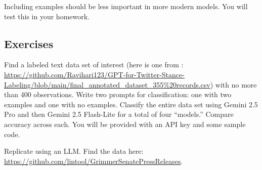 Including examples should be less important in more modern models. You will test this in your homework.

\subsection{Exercises}

\begin{tcolorbox}[breakable, size=fbox, boxrule=1pt, pad at break*=1mm,colback=cellbackground, colframe=cellborder, title=Exercise: LLM Classification Comparison]
Find a labeled text data set of interest (here is one from \cite{liyanage2024gpt}: \url{https://github.com/Ravihari123/GPT-for-Twitter-Stance-Labeling/blob/main/final_annotated_dataset_355\%20records.csv}) with no more than 400 observations. Write two prompts for classification: one with two examples and one with no examples. Classify the entire data set using Gemini 2.5 Pro and then Gemini 2.5 Flash-Lite for a total of four ``models.'' Compare accuracy across each. You will be provided with an API key and some sample code.
\end{tcolorbox}

\begin{tcolorbox}[breakable, size=fbox, boxrule=1pt, pad at break*=1mm,colback=cellbackground, colframe=cellborder, title=Exercise: Grimmer Replication]
Replicate \cite{grimmer2010bayesian} using an LLM. Find the data here: \url{https://github.com/lintool/GrimmerSenatePressReleases}.
\end{tcolorbox}